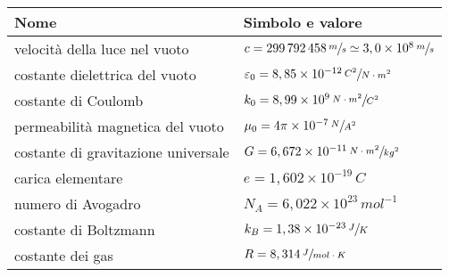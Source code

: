 \documentclass[a4paper,11pt,italian]{article}
\begin{document}
\begin{description}
  \begin{table}[htp]\centering
    \begin{tabular}{ll}\toprule
      \textbf{Nome} & \textbf{Simbolo e valore}\\\midrule
      velocità della luce nel vuoto & $ c = 299\,  792\, 458\,	\sfrac{m}{s} \simeq 3,0 \times 10^8 \,	\sfrac{m}{s} $ \\\addlinespace[.2em]
      costante dielettrica del vuoto & $ \varepsilon_0 = 8,85\times 10^{-12} \, \sfrac{C^2}{N \cdot m^2} $ \\\addlinespace[.2em]
      costante di Coulomb & $ k_0 = 8,99 \times 10^9 \, \sfrac{N \cdot m^2}{C^2} $ \\\addlinespace[.2em]
      permeabilità magnetica del vuoto & $ \mu_0 = 4\pi \times 10^{-7} \, \sfrac{N}{A^2} $ \\\addlinespace[.2em]
      costante di gravitazione universale & $ G = 6,672 \times 10^{-11} \, \sfrac{N \cdot m^2}{kg^2} $ \\\addlinespace[.2em]
      carica elementare & $ e = 1,602 \times 10^{-19} \, C $ \\\addlinespace[.2em]
      numero di Avogadro & $ N_A = 6,022 \times 10^{23} \, mol^{-1} $ \\\addlinespace[.2em]
      costante di Boltzmann & $ k_B = 1,38 \times 10^{-23} \, \sfrac{J}{K} $ \\\addlinespace[.2em]
      costante dei gas & $ R = 8,314 \, \sfrac{J}{mol \cdot K} $ \\\bottomrule
    \end{tabular}
  \end{table}  


\end{description}
\end{document}
